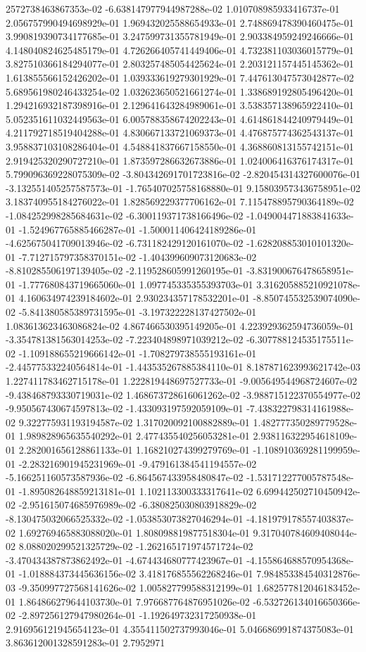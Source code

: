 2572738463867353e-02	-6.638147977944987288e-02	1.010708985933416737e-01	2.056757990494698929e-01	1.969432025588654933e-01	2.748869478390460475e-01	3.990819390734177685e-01	3.247599731355781949e-01	2.903384959249246666e-01	4.148040824625485179e-01	4.726266405741449406e-01	4.732381103036015779e-01	3.827510366184294077e-01	2.803257485054425624e-01	2.203121157445145362e-01	1.613855566152426202e-01	1.039333619279301929e-01	7.447613047573042877e-02	5.689561980246433254e-02	1.032623650521661274e-01	1.338689192805496420e-01	1.294216932187398916e-01	2.129641643284989061e-01	3.538357138965922410e-01	5.052351611032449563e-01	6.005788358674202243e-01	4.614861844240979449e-01	4.211792718519404288e-01	4.830667133721069373e-01	4.476875774362543137e-01	3.958837103108286404e-01	4.548841837667158550e-01	4.368860813155742151e-01	2.919425320290727210e-01	1.873597286632673886e-01	1.024006416376174317e-01	5.799096369228075309e-02	-3.804342691701723816e-02	-2.820454314327600076e-01	-3.132551405257587573e-01	-1.765407025758168880e-01	9.158039573436758951e-02	3.183740955184276022e-01	1.828569229377706162e-01	7.115478895790364189e-02	-1.084252998285684631e-02	-6.300119371738166496e-02	-1.049004471883841633e-01	-1.524967765885466287e-01	-1.500011406424189286e-01	-4.625675041709013946e-02	-6.731182429120161070e-02	-1.628208853010101320e-01	-7.712715797358370151e-02	-1.404399609073120683e-02	-8.810285506197139405e-02	-2.119528605991260195e-01	-3.831900676478658951e-01	-1.777680843719665060e-01	1.097745335355393703e-01	3.316205885210921078e-01	4.160634974239184602e-01	2.930234357178532201e-01	-8.850745532539074090e-02	-5.841380585389731595e-01	-3.197322228137427502e-01	1.083613623463086824e-02	4.867466530395149205e-01	4.223929362594736059e-01	-3.354781381563014253e-02	-7.223404898971039212e-02	-6.307788124535175511e-02	-1.109188655219666142e-01	-1.708279738555193161e-01	-2.445775332240564814e-01	-1.443535267885384110e-01	8.187871623993621742e-03	1.227411783462715178e-01	1.222819448697527733e-01	-9.005649544968724607e-02	-9.438468793330719031e-02	1.468673728616061262e-02	-3.988715122370554977e-02	-9.950567430674597813e-02	-1.433093197592059109e-01	-7.438322798314161988e-02	9.322775931193194587e-02	1.317020092100882889e-01	1.482777350289779528e-01	1.989828965635540292e-01	2.477435540256053281e-01	2.938116322954618109e-01	2.282001656128861133e-01	1.168210274399279769e-01	-1.108910369281199959e-01	-2.283216901945231969e-01	-9.479161384541194557e-02	-5.166251160573587936e-02	-6.864567433958480847e-02	-1.531712277005787548e-01	-1.895082648859213181e-01	1.102113300333317641e-02	6.699442502710450942e-02	-2.951615074685976989e-02	-6.380825030803918829e-02	-8.130475032066525332e-02	-1.053853073827046294e-01	-4.181979178557403837e-02	1.692769465883088020e-01	1.808098819877518304e-01	9.317040784609408044e-02	8.088020299521325729e-02	-1.262165171974571724e-02	-3.470434387873862492e-01	-4.674434680777423967e-01	-4.155864688570954368e-01	-1.018884373445636156e-02	3.418176855562268246e-01	7.984853384540312876e-03	-9.350997727568141626e-02	1.005827799588312199e-01	1.682577812046183452e-01	1.864866279644103730e-01	7.976687764876951026e-02	-6.532726134016650366e-02	-2.897256127947980264e-01	-1.192649732317250938e-01	2.916956121945654123e-01	4.355411502737993046e-01	5.046686991874375083e-01	3.863612001328591283e-01	2.7952971